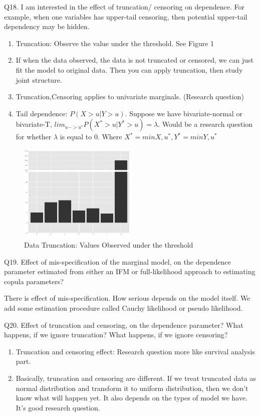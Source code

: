 \documentclass[a4paper,12pt]{texMemo}
\begin{document}
Q18. I am interested in the effect of truncation/ censoring on dependence.
For example, when one variables has upper-tail censoring, then potential upper-tail dependency may be hidden.

\begin{enumerate}
\item Truncation: Observe the value under the threshold. See Figure 1
\item If when the data observed, the data is not truncated or censored, we can just fit the model to original data.
Then you can apply truncation, then study joint structure. 
\item Truncation,Censoring applies to univariate marginals. (Research question) 
\item Tail dependence: $P(X>u|Y>u)$. Suppose we have bivariate-normal or bivariate-T,  $lim_{u->u^*}P(X^*>u|Y^*>u)=\lambda$. Would be a research question for whether $\lambda$ is equal to 0. Where $X^*=min{X,u^*},Y^*=min{Y,u^*}$   
\end{enumerate}
\begin{figure}
\centering
\includegraphics[width=0.5\textwidth]{truncate.png}
\caption{\label{fig: Example of Data Truncation} Data Truncation: Values Observed under the threshold}
\end{figure}


Q19. Effect of mis-specification of the marginal model, on the dependence parameter estimated from either an IFM or full-likelihood approach to estimating copula parameters?

There is effect of mis-specification. How serious depends on the model itself. We add some estimation procedure called Cauchy likelihood or pseudo likelihood.


Q20. Effect of truncation and censoring, on the dependence parameter? What happens, if we ignore truncation? What happens, if we ignore censoring?

\begin{enumerate}
\item Truncation and censoring effect: Research question more like survival analysis part.
\item Basically, truncation and censoring are different. If we treat truncated data as normal distribution and transform it to uniform distribution, then we don't know what will happen yet. It also depends on the types of model we have. It's good research question. 
\end{enumerate}
\end{document}
